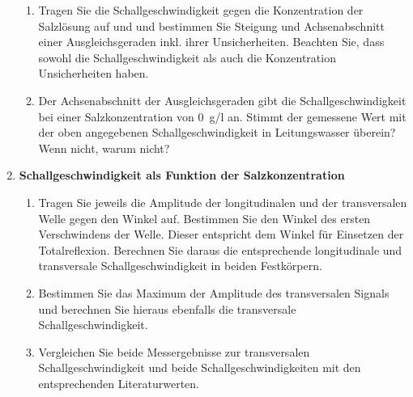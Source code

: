 \begin{enumerate}
\begin{enumerate}
		\item Tragen Sie die Schallgeschwindigkeit gegen die Konzentration der Salzlösung auf und und bestimmen Sie Steigung und Achsenabschnitt einer Ausgleichsgeraden inkl. ihrer Unsicherheiten. Beachten Sie, dass sowohl die Schallgeschwindigkeit als auch die Konzentration Unsicherheiten haben.
		\item Der Achsenabschnitt der Ausgleichsgeraden gibt die Schallgeschwindigkeit bei einer Salzkonzentration von 0~g/l an. Stimmt der gemessene Wert mit der oben angegebenen Schallgeschwindigkeit in Leitungswasser überein? Wenn nicht, warum nicht?
	\end{enumerate}
	\item \textbf{Schallgeschwindigkeit als Funktion der Salzkonzentration}
	\begin{enumerate}
		\item Tragen Sie jeweils die Amplitude der longitudinalen und der transversalen Welle gegen den Winkel auf. Bestimmen Sie den Winkel des ersten Verschwindens der Welle. Dieser entspricht dem Winkel für Einsetzen der Totalreflexion. Berechnen Sie daraus die entsprechende longitudinale und transversale Schallgeschwindigkeit in beiden Festkörpern.
		\item Bestimmen Sie das Maximum der Amplitude des transversalen Signals und berechnen Sie hieraus ebenfalls die transversale Schallgeschwindigkeit.
		\item Vergleichen Sie beide Messergebnisse zur transversalen Schallgeschwindigkeit und beide Schallgeschwindigkeiten mit den entsprechenden Literaturwerten.
	\end{enumerate}
\end{enumerate}